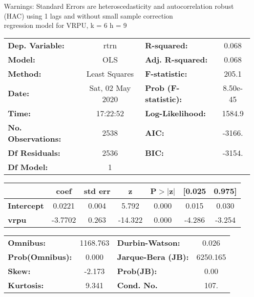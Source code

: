 Warnings: \newline
 [1] Standard Errors are heteroscedasticity and autocorrelation robust (HAC) using 1 lags and without small sample correction\\ 

regression model for VRPU, k = 6 h = 9\begin{center}
\begin{tabular}{lclc}
\toprule
\textbf{Dep. Variable:}    &       rtrn       & \textbf{  R-squared:         } &     0.068   \\
\textbf{Model:}            &       OLS        & \textbf{  Adj. R-squared:    } &     0.068   \\
\textbf{Method:}           &  Least Squares   & \textbf{  F-statistic:       } &     205.1   \\
\textbf{Date:}             & Sat, 02 May 2020 & \textbf{  Prob (F-statistic):} &  8.50e-45   \\
\textbf{Time:}             &     17:22:52     & \textbf{  Log-Likelihood:    } &    1584.9   \\
\textbf{No. Observations:} &        2538      & \textbf{  AIC:               } &    -3166.   \\
\textbf{Df Residuals:}     &        2536      & \textbf{  BIC:               } &    -3154.   \\
\textbf{Df Model:}         &           1      & \textbf{                     } &             \\
\bottomrule
\end{tabular}
\begin{tabular}{lcccccc}
                   & \textbf{coef} & \textbf{std err} & \textbf{z} & \textbf{P$> |$z$|$} & \textbf{[0.025} & \textbf{0.975]}  \\
\midrule
\textbf{Intercept} &       0.0221  &        0.004     &     5.792  &         0.000        &        0.015    &        0.030     \\
\textbf{vrpu}      &      -3.7702  &        0.263     &   -14.322  &         0.000        &       -4.286    &       -3.254     \\
\bottomrule
\end{tabular}
\begin{tabular}{lclc}
\textbf{Omnibus:}       & 1168.763 & \textbf{  Durbin-Watson:     } &    0.026  \\
\textbf{Prob(Omnibus):} &   0.000  & \textbf{  Jarque-Bera (JB):  } & 6250.165  \\
\textbf{Skew:}          &  -2.173  & \textbf{  Prob(JB):          } &     0.00  \\
\textbf{Kurtosis:}      &   9.341  & \textbf{  Cond. No.          } &     107.  \\
\bottomrule
\end{tabular}
\end{center}

